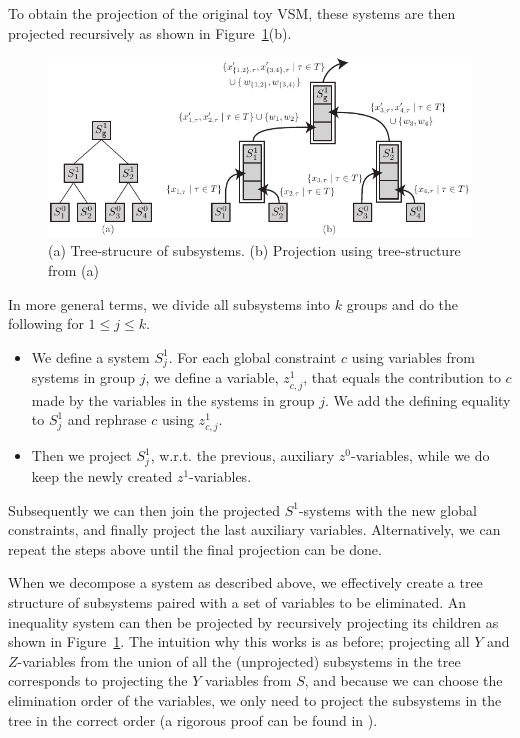 \documentclass{llncs}
\begin{document}
To obtain the projection of the original toy VSM, these systems are then projected recursively as shown in Figure~\ref{fig:decomp2}(b).
%
\begin{figure}[bt]
	\centering
		\includegraphics{figures/Example7.pdf}
	\caption{(a) Tree-strucure of subsystems. (b) Projection using tree-structure from (a)}
	\label{fig:decomp2}
\end{figure}

In more general terms, we divide all subsystems into $k$ groups and do the following for $1\leq j\leq k$. 
\begin{itemize}[noitemsep,topsep=0pt]
\item We define a system $S^1_j$. For each global constraint $c$ using variables from systems in group $j$, we define a variable, $z^1_{c,j}$, that equals the contribution to $c$ made by the variables in the systems in group $j$. We add the defining equality to $S^1_j$ and rephrase $c$ using $z^1_{c,j}$.
\item Then we project $S^1_j$, w.r.t. the previous, auxiliary $z^0$-variables, while we do keep the newly created $z^1$-variables.
\end{itemize} 
Subsequently we can then join the projected $S^1$-systems with the new global constraints, and finally project the last auxiliary variables. Alternatively, we can repeat the steps above until the final projection can be done. 

When we decompose a system as described above, we effectively create a tree structure of subsystems paired with a set of variables to be eliminated. An inequality system can then be projected by recursively projecting its children as shown in Figure~\ref{fig:decomp2}.
The intuition why this works is as before; projecting all $Y$ and $Z$-variables from the union of all the (unprojected) subsystems in the tree corresponds to projecting the $Y$ variables from $S$, and because we can choose the elimination order of the variables, we only need to project the subsystems in the tree in the correct order (a rigorous proof can be found in \cite{mytechrep}).
\end{document}
